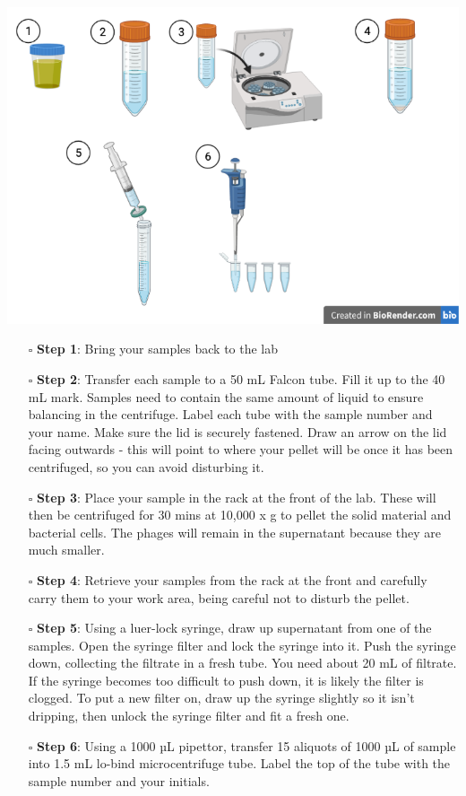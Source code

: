 \documentclass[
]{book}
\providecommand{\tightlist}{%
  \setlength{\itemsep}{0pt}\setlength{\parskip}{0pt}}
\begin{document}
\includegraphics{images/sample-preparation.png}

\begin{itemize}
\tightlist
\item[$\square$]
  \textbf{Step 1}: Bring your samples back to the lab
\item[$\square$]
  \textbf{Step 2}: Transfer each sample to a 50 mL Falcon tube. Fill it up to the 40 mL mark. Samples need to contain the same amount of liquid to ensure balancing in the centrifuge. Label each tube with the sample number and your name. Make sure the lid is securely fastened. Draw an arrow on the lid facing outwards - this will point to where your pellet will be once it has been centrifuged, so you can avoid disturbing it.
\item[$\square$]
  \textbf{Step 3}: Place your sample in the rack at the front of the lab. These will then be centrifuged for 30 mins at 10,000 x g to pellet the solid material and bacterial cells. The phages will remain in the supernatant because they are much smaller.
\item[$\square$]
  \textbf{Step 4}: Retrieve your samples from the rack at the front and carefully carry them to your work area, being careful not to disturb the pellet.
\item[$\square$]
  \textbf{Step 5}: Using a luer-lock syringe, draw up supernatant from one of the samples. Open the syringe filter and lock the syringe into it. Push the syringe down, collecting the filtrate in a fresh tube. You need about 20 mL of filtrate. If the syringe becomes too difficult to push down, it is likely the filter is clogged. To put a new filter on, draw up the syringe slightly so it isn't dripping, then unlock the syringe filter and fit a fresh one.
\item[$\square$]
  \textbf{Step 6}: Using a 1000 µL pipettor, transfer 15 aliquots of 1000 µL of sample into 1.5 mL lo-bind microcentrifuge tube. Label the top of the tube with the sample number and your initials.
\end{itemize}
\end{document}
